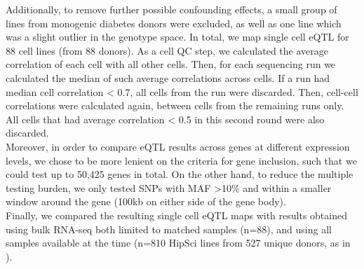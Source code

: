Additionally, to remove further possible confounding effects, a small group of lines from monogenic diabetes donors were excluded, as well as one line which was a slight outlier in the genotype space.
In total, we map single cell eQTL for 88 cell lines (from 88 donors).
As a cell QC step, we calculated the average correlation of each cell with all other cells.
Then, for each sequencing run we calculated the median of such average correlations across cells.
If a run had median cell correlation < 0.7, all cells from the run were discarded.
Then, cell-cell correlations were calculated again, between cells from the remaining runs only.
All cells that had average correlation < 0.5 in this second round were also discarded.
\\

Moreover, in order to compare eQTL results across genes at different expression levels, we chose to be more lenient on the criteria for gene inclusion, such that we could test
up to 50,425 genes in total. 
On the other hand, to reduce the multiple testing burden, we only tested SNPs with MAF >10\% and within a smaller window around the gene (100kb on either side of the gene body).
\\

Finally, we compared the resulting single cell eQTL maps with results obtained using bulk RNA-seq both limited to matched samples (n=88), and using all samples available at the time (n=810 HipSci lines from 527 unique donors, as in \cite{bonder2019systematic}). 




